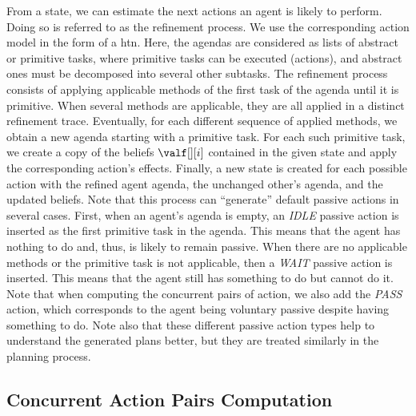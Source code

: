 From a state, we can estimate the next actions an agent is likely to perform. Doing so is referred to as the refinement process. We use the corresponding action model in the form of a \acrfull{htn}. Here, the agendas are considered as lists of abstract or primitive tasks, where primitive tasks can be executed (actions), and abstract ones must be decomposed into several other subtasks. 
The refinement process consists of applying applicable methods of the first task of the agenda until it is primitive. When several methods are applicable, they are all applied in a distinct refinement trace.
Eventually, for each different sequence of applied methods, we obtain a new agenda starting with a primitive task. For each such primitive task, we create a copy of the beliefs $\valf[][i]$ contained in the given state and apply the corresponding action's effects. 
Finally, a new state is created for each possible action with the refined agent agenda, the unchanged other's agenda, and the updated beliefs. 
Note that this process can ``generate'' default passive actions in several cases. First, when an agent's agenda is empty, an \textit{IDLE} passive action is inserted as the first primitive task in the agenda. This means that the agent has nothing to do and, thus, is likely to remain passive. When there are no applicable methods or the primitive task is not applicable, then a \textit{WAIT} passive action is inserted. This means that the agent still has something to do but cannot do it. Note that when computing the concurrent pairs of action, we also add the \textit{PASS} action, which corresponds to the agent being voluntary passive despite having something to do. Note also that these different passive action types help to understand the generated plans better, but they are treated similarly in the planning process.

    \subsection{Concurrent Action Pairs Computation}

